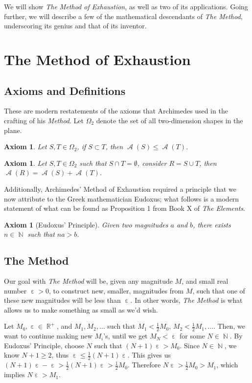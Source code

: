 \documentclass[letterpaper, 12pt]{amsart}
\DeclareMathOperator{\N}{\mathbb{N}}
\DeclareMathOperator{\R}{\mathbb{R}}
\DeclareMathOperator{\A}{\mathcal{A}}
\DeclareMathOperator{\ep}{\varepsilon}
\newtheorem{axe}[thm]{Axiom}
\theoremstyle{definition}  %
\begin{document}
	We will show \textit{The Method of Exhaustion}, as well as two of its applications.
	Going further, we will describe a few of the mathematical descendants of \textit{The Method}, underscoring its genius and that of its inventor.

	\section{The Method of Exhaustion}
	\label{sec:the_method_of_exhaustion}
		\subsection{Axioms and Definitions}
		\label{sub:axioms_and_definitions}
		These are modern restatements of the axioms that Archimedes used in the crafting of his \textit{Method}.
		Let $\Omega_{2}$ denote the set of all two-dimension shapes in the plane.

		\begin{axe}
		Let $S,T \in \Omega_{2}$, if $S \subset T$, then $\A(S) \leq \A(T)$.
		\end{axe}

		\begin{axe}
		Let $S,T \in \Omega_{2}$ such that $S \cap T = \emptyset$, consider $R = S \cup T$, then $\A(R) = \A(S) + \A(T)$.
		\end{axe}

		Additionally, Archimedes' Method of Exhaustion required a principle that we now attribute to the Greek mathematician Eudoxus; what follows is a modern statement of what can be found as Proposition 1 from Book X of \textit{The Elements}.
		\begin{axe}[Eudoxus' Principle]
		\label{axe:eudoxus}
		Given two magnitudes $a$ and $b$, there exists $n \in \N$ such that $na>b$.
		\end{axe}		

		\subsection{The Method}
		\label{sub:the_method}
		Our goal with \textit{The Method} will be, given any magnitude $M$, and small real number $\ep > 0$, to construct new, smaller, magnitudes from $M$, such that one of these new magnitudes will be less than $\ep$.
		In other words, \textit{The Method} is what allows us to make something as small as we'd wish.

		Let $M_{0}, \ep \in \R^{+}$, and $M_{1}, M_{2}, \dots$ such that $M_{1} < \tfrac{1}{2}M_{0}, \, M_{2} < \tfrac{1}{2}M_{1}, \dots$.
		Then, we want to continue making new $M_{i}$'s, until we get $M_{N} < \ep$ for some $N \in \N$.
		By Eudoxus' Principle, choose $N$ such that $(N+1)\ep > M_{0}$.
		Since $N \in \N$, we know $N+1 \geq 2$, thus $\ep \leq \frac{1}{2}(N+1)\ep$.
		This gives us $(N+1)\ep - \ep > \tfrac{1}{2}(N+1)\ep > \tfrac{1}{2}M_{0}$.
		Therefore $N\ep > \tfrac{1}{2}M_{0} > M_{1}$, which implies $N\ep > M_{1}$.
\end{document}
